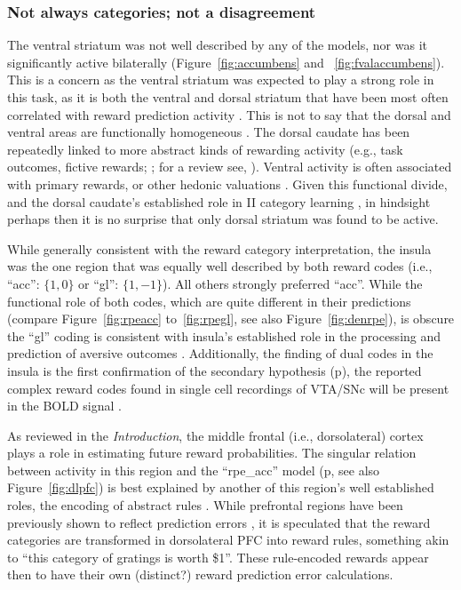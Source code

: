 \subsubsection{Not always categories; not a disagreement}
\label{subsub:conana}
The ventral striatum was not well described by any of the models, nor was it significantly active bilaterally (Figure~\ref{fig:accumbens} and ~\ref{fig:fvalaccumbens}).  This is a concern as the ventral striatum was expected to play a strong role in this task, as it is both the ventral and dorsal striatum that have been most often correlated with reward prediction activity \cite{ODoherty:2003p6329,Knutson:2007p1687,Schonberg:2007p518}.  This is not to say that the dorsal and ventral areas are functionally homogeneous \cite{Schonberg:2009p6669,ODoherty:2004p1269,Atallah:2007p1746}.  The dorsal caudate has been repeatedly linked to more abstract kinds of rewarding activity (e.g., task outcomes, fictive rewards; ; for a review see, ).  Ventral activity is often associated with primary rewards, or other hedonic valuations \cite{ODoherty:2004p1269}.  Given this functional divide, and the dorsal caudate's established role in II category learning \cite{Ashby:1998p9716}, in hindsight perhaps then it is no surprise that only dorsal striatum was found to be active.

While generally consistent with the reward category interpretation, the insula was the one region that was equally well described by both reward codes (i.e., ``acc'': $\{1,0\}$ or ``gl'': $\{1,-1\}$).  All others strongly preferred ``acc''.  While the functional role of both codes, which are quite different in their predictions (compare Figure~\ref{fig:rpeacc} to~\ref{fig:rpegl}, see also Figure~\ref{fig:denrpe}), is obscure the ``gl'' coding is consistent with insula's established role in the processing and prediction of aversive outcomes \cite{Chua:1999p9833,Phillips:1998p9834,Buchel:1998p9836,Elliott:2000p1637}.  Additionally, the finding of dual codes in the insula is the first confirmation of the secondary hypothesis (p\pageref{subsub:codesandfits}), the reported complex reward codes found in single cell recordings of VTA/SNc will be present in the BOLD signal \cite{Kim:2006p1063,Matsumoto:2009p7219,Smith:2011p8133}.

As reviewed in the \emph{Introduction}, the middle frontal (i.e., dorsolateral) cortex plays a role in estimating future reward probabilities.  The singular relation between activity in this region and the ``rpe\_acc'' model (p\pageref{subsub:onsheet}, see also Figure~\ref{fig:dlpfc}) is best explained by another of this region's well established roles, the encoding of abstract rules \cite{Wallis:2001p8129}.  While prefrontal regions have been previously shown to reflect prediction errors \cite{Ramnani:2004p5390}, it is speculated that the reward categories are transformed in dorsolateral PFC into reward rules, something akin to ``this category of gratings is worth \$1''.  These rule-encoded rewards appear then to have their own (distinct?) reward prediction error calculations.


